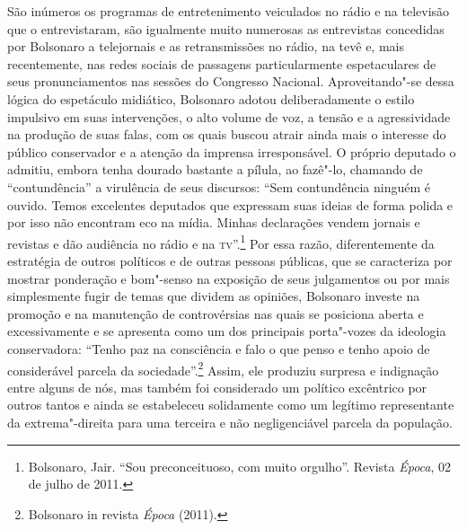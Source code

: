São inúmeros os programas de entretenimento veiculados no rádio e na
televisão que o entrevistaram, são igualmente muito numerosas as
entrevistas concedidas por Bolsonaro a telejornais e as retransmissões
no rádio, na tevê e, mais recentemente, nas redes sociais de passagens
particularmente espetaculares de seus pronunciamentos nas sessões do
Congresso Nacional. Aproveitando"-se dessa lógica do espetáculo
midiático, Bolsonaro adotou deliberadamente o estilo impulsivo em suas
intervenções, o alto volume de voz, a tensão e a agressividade na
produção de suas falas, com os quais buscou atrair ainda mais o
interesse do público conservador e a atenção da imprensa irresponsável.
O próprio deputado o admitiu, embora tenha dourado bastante a pílula, ao
fazê"-lo, chamando de ``contundência'' a virulência de seus discursos:
``Sem contundência ninguém é ouvido. Temos excelentes deputados que
expressam suas ideias de forma polida e por isso não encontram eco na
mídia. Minhas declarações vendem jornais e revistas e dão audiência no
rádio e na \textsc{tv}''.\footnote{Bolsonaro, Jair. ``Sou preconceituoso, com
  muito orgulho''. Revista \emph{Época}, 02 de julho de 2011.}
Por essa razão, diferentemente da estratégia de outros políticos e de
outras pessoas públicas, que se caracteriza por mostrar ponderação e
bom"-senso na exposição de seus julgamentos ou por mais simplesmente
fugir de temas que dividem as opiniões, Bolsonaro investe na promoção e
na manutenção de controvérsias nas quais se posiciona aberta e
excessivamente e se apresenta como um dos principais porta"-vozes da
ideologia conservadora: ``Tenho paz na consciência e falo o que penso e
tenho apoio de considerável parcela da sociedade''.\footnote{Bolsonaro in
  revista \emph{Época} (2011).} Assim, ele produziu surpresa e
indignação entre alguns de nós, mas também foi considerado um político
excêntrico por outros tantos e ainda se estabeleceu solidamente como um
legítimo representante da extrema"-direita para uma terceira e não
negligenciável parcela da população.

